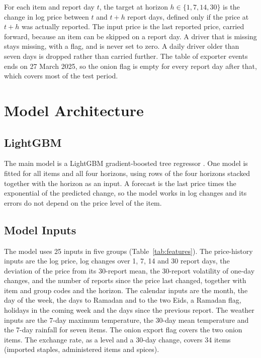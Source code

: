 \documentclass[12pt]{report}
\begin{document}
For each item and report day $t$, the target at horizon $h \in \{1,7,14,30\}$ is the change in log price between $t$ and $t+h$ report days, defined only if the price at $t+h$ was actually reported. The input price is the last reported price, carried forward, because an item can be skipped on a report day. A driver that is missing stays missing, with a flag, and is never set to zero. A daily driver older than seven days is dropped rather than carried further. The table of exporter events ends on 27 March 2025, so the onion flag is empty for every report day after that, which covers most of the test period.

\section{Model Architecture}

\subsection{LightGBM}
The main model is a LightGBM gradient-boosted tree regressor \cite{lightgbm}. One model is fitted for all items and all four horizons, using rows of the four horizons stacked together with the horizon as an input. A forecast is the last price times the exponential of the predicted change, so the model works in log changes and its errors do not depend on the price level of the item.

\subsection{Model Inputs}
The model uses 25 inputs in five groups (Table~\ref{tab:features}). The price-history inputs are the log price, log changes over 1, 7, 14 and 30 report days, the deviation of the price from its 30-report mean, the 30-report volatility of one-day changes, and the number of reports since the price last changed, together with item and group codes and the horizon. The calendar inputs are the month, the day of the week, the days to Ramadan and to the two Eids, a Ramadan flag, holidays in the coming week and the days since the previous report. The weather inputs are the 7-day maximum temperature, the 30-day mean temperature and the 7-day rainfall for seven items. The onion export flag covers the two onion items. The exchange rate, as a level and a 30-day change, covers 34 items (imported staples, administered items and spices).
\end{document}

